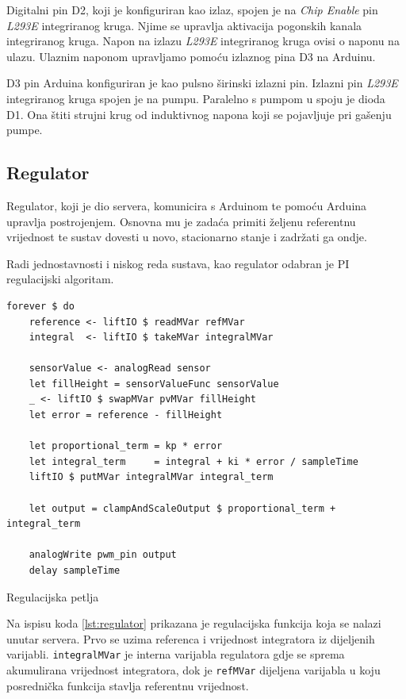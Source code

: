 Digitalni pin D2, koji je konfiguriran kao izlaz, spojen je na \emph{Chip Enable}
pin \emph{L293E} integriranog kruga. Njime se upravlja aktivacija pogonskih
kanala integriranog kruga. Napon na izlazu \emph{L293E} integriranog kruga ovisi
o naponu na ulazu. Ulaznim naponom upravljamo pomoću izlaznog pina D3 na
Arduinu.

D3 pin Arduina konfiguriran je kao pulsno širinski izlazni pin. Izlazni
pin \emph{L293E} integriranog kruga spojen je na pumpu. Paralelno s pumpom u
spoju je dioda D1. Ona štiti strujni krug od induktivnog napona koji se pojavljuje
pri gašenju pumpe.

\subsection{Regulator}

Regulator, koji je dio servera, komunicira s Arduinom te pomoću Arduina upravlja
postrojenjem. Osnovna mu je zadaća primiti željenu referentnu vrijednost te
sustav dovesti u novo, stacionarno stanje i zadržati ga ondje.

Radi jednostavnosti i niskog reda sustava, kao regulator odabran je PI
regulacijski algoritam.

\begin{listing}[H]
\centering
\begin{verbatim}
forever $ do
    reference <- liftIO $ readMVar refMVar
    integral  <- liftIO $ takeMVar integralMVar

    sensorValue <- analogRead sensor
    let fillHeight = sensorValueFunc sensorValue
    _ <- liftIO $ swapMVar pvMVar fillHeight
    let error = reference - fillHeight

    let proportional_term = kp * error
    let integral_term     = integral + ki * error / sampleTime
    liftIO $ putMVar integralMVar integral_term

    let output = clampAndScaleOutput $ proportional_term + integral_term

    analogWrite pwm_pin output
    delay sampleTime
\end{verbatim}
\caption{Regulacijska petlja}
\label{lst:regulator}
\end{listing}

Na ispisu koda \ref{lst:regulator} prikazana je regulacijska funkcija koja se
nalazi unutar servera. Prvo se uzima referenca i vrijednost integratora iz dijeljenih varijabli.
\texttt{integralMVar} je interna varijabla regulatora gdje se
sprema akumulirana vrijednost integratora, dok je \texttt{refMVar}
dijeljena varijabla u koju posrednička funkcija stavlja referentnu vrijednost.

